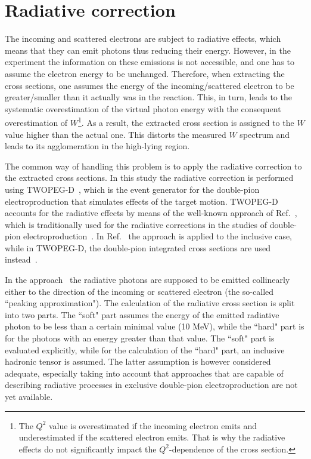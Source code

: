 

\section{Radiative correction}
\label{Sect:rad_corr}

The incoming and scattered electrons are subject to radiative effects, which means that they can emit photons thus reducing their energy. However, in the experiment the information on these emissions is not accessible, and one has to assume the electron energy to be unchanged. Therefore, when extracting the cross sections, one assumes the energy of the incoming/scattered electron to be greater/smaller than it actually was in the reaction. This, in turn, leads to the systematic overestimation of the virtual photon energy with the consequent overestimation of $W$\footnote[2]{The $Q^2$ value is overestimated if the incoming electron emits and underestimated if the scattered electron emits. That is why the radiative effects do not significantly impact the $Q^{2}$-dependence of the cross section.}. As a result, the extracted cross section is assigned to the $W$ value higher than the actual one. This distorts the measured $W$ spectrum and leads to its agglomeration in the high-lying region.


The common way of handling this problem is to apply the radiative correction to the extracted cross sections. In this study the radiative correction is performed using TWOPEG-D~\cite{twopeg-d}, which is the event generator for the double-pion electroproduction that simulates effects of the target motion. TWOPEG-D accounts for the radiative effects by means of the well-known approach of Ref.~\cite{Mo:1968cg}, which is traditionally used for the radiative corrections in the studies of double-pion electroproduction~\cite{Rip_an_note:2002,Ripani:2002ss,Fed_an_note:2007,Fedotov:2008aa,Fed_an_note:2017,Fed_paper_2018,Isupov:2017lnd,Arjun}. In Ref.~\cite{Mo:1968cg} the approach is applied to the inclusive case, while in TWOPEG-D, the double-pion integrated cross sections are used instead~\cite{twopeg,twopeg-d}. 

In the approach~\cite{Mo:1968cg,twopeg,twopeg-d} the radiative photons are supposed to be emitted collinearly either to the direction of the incoming or scattered electron (the so-called ``peaking approximation"). The calculation of the radiative cross section is split into two parts. The ``soft" part assumes the energy of the emitted radiative photon to be less than a certain minimal value (10 MeV), while the ``hard" part is for the photons with an energy greater than that value. The ``soft" part is evaluated explicitly, while for the calculation of the ``hard" part, an inclusive hadronic tensor is assumed. The latter assumption is however considered adequate, especially taking into account that approaches that are capable of describing radiative processes in exclusive double-pion electroproduction are not yet available.



